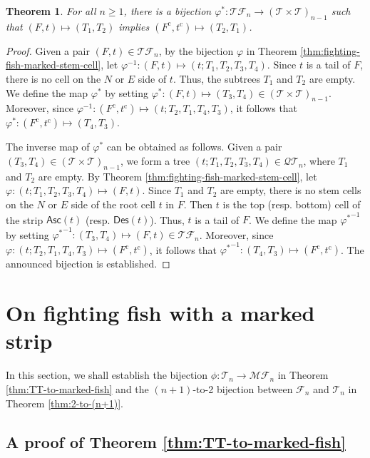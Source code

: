 \documentclass[a4paper,11pt,reqno]{amsart}
\newtheorem{thm}[lem]{Theorem}
\theoremstyle{definition}
\numberwithin{equation}{section}
\newcommand{\Des}{{\textsf{Des}}}
\newcommand{\Asc}{{\textsf{Asc}}}
\newcommand{\cc}{{\mathrm{c}}}
\newcommand{\MF}{{\mathcal{MF}}}
\newcommand{\TF}{{\mathcal{TF}}}
\newcommand{\QT}{{\mathcal{QT}}}
\newcommand{\F}{{\mathcal{F}}}
\newcommand{\T}{{\mathcal{T}}}
\begin{document}
\begin{thm} \label{thm:pair-ternary-trees} For all $n\ge 1$, there is a bijection $\varphi^*:\TF_n\rightarrow (\T\times\T)_{n-1}$
such that $(F,t)\mapsto (T_1,T_2)$ implies $(F^{\cc}, t^{\cc})\mapsto (T_2,T_1)$.
\end{thm}

\begin{proof} Given a pair $(F,t)\in\TF_n$, by the bijection $\varphi$ in Theorem \ref{thm:fighting-fish-marked-stem-cell}, let $\varphi^{-1}:(F,t)\mapsto (t;T_1,T_2,T_3,T_4)$. Since $t$ is a tail of $F$, there is no cell on the $N$ or $E$ side of $t$. Thus, the subtrees $T_1$ and $T_2$ are empty. We define the map $\varphi^*$ by setting $\varphi^*:(F,t)\mapsto (T_3,T_4)\in(\T\times\T)_{n-1}$. Moreover, since $\varphi^{-1}:(F^{\cc},t^{\cc})\mapsto (t;T_2,T_1,T_4,T_3)$, it follows that $\varphi^*:(F^{\cc},t^{\cc})\mapsto (T_4,T_3)$.

The inverse map of $\varphi^*$ can be obtained as follows. Given a pair $(T_3,T_4)\in(\T\times\T)_{n-1}$, we form a tree $(t;T_1,T_2,T_3,T_4)\in\QT_n$, where $T_1$ and $T_2$ are empty. By Theorem \ref{thm:fighting-fish-marked-stem-cell}, let $\varphi:(t;T_1,T_2,T_3,T_4)\mapsto (F,t)$. Since $T_1$ and $T_2$ are empty, there is no stem cells on the $N$ or $E$ side of the root cell $t$ in $F$. Then $t$ is the top (resp. bottom) cell of the strip $\Asc(t)$ (resp. $\Des(t)$). Thus, $t$ is a tail of $F$. We define the map ${\varphi^*}^{-1}$ by setting ${\varphi^*}^{-1}:(T_3,T_4)\mapsto (F,t)\in\TF_n$.
Moreover, since $\varphi:(t;T_2,T_1,T_4,T_3)\mapsto (F^{\cc},t^{\cc})$, it follows that ${\varphi^*}^{-1}:(T_4,T_3)\mapsto (F^{\cc},t^{\cc})$. The announced bijection is established.
\end{proof}





\section{On fighting fish with a marked strip} \label{sec:marked-strip}

In this section, we shall establish the bijection $\phi:\T_n\rightarrow\MF_n$ in Theorem \ref{thm:TT-to-marked-fish} and the $(n+1)$-to-2 bijection between $\F_n$ and $\T_n$ in Theorem \ref{thm:2-to-(n+1)}.

\subsection{A proof of Theorem \ref{thm:TT-to-marked-fish}}
\end{document}
